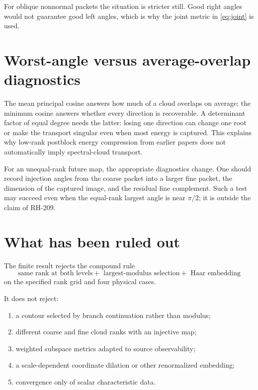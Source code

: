 \documentclass[12pt]{article}
\theoremstyle{remark}\newtheorem{remark}[theorem]{Remark}
\begin{document}
For oblique nonnormal packets the situation is stricter still.  Good right
angles would not guarantee good left angles, which is why the joint metric
in \eqref{eq:joint} is used.

\section{Worst-angle versus average-overlap diagnostics}

The mean principal cosine answers how much of a cloud overlaps on average;
the minimum cosine answers whether every direction is recoverable.  A
determinant factor of equal degree needs the latter: losing one direction can
change one root or make the transport singular even when most energy is
captured.  This explains why low-rank postblock energy compression from
earlier papers does not automatically imply spectral-cloud transport.

For an unequal-rank future map, the appropriate diagnostics change.  One
should record injection angles from the coarse packet into a larger fine
packet, the dimension of the captured image, and the residual fine
complement.  Such a test may succeed even when the equal-rank largest angle
is near $\pi/2$; it is outside the claim of RH-209.

\section{What has been ruled out}

The finite result rejects the compound rule
\begin{equation}\label{eq:rejected}
 \text{same rank at both levels}
 +\text{ largest-modulus selection}
 +\text{ Haar embedding}
\end{equation}
on the specified rank grid and four physical cases.

It does not reject:
\begin{enumerate}[leftmargin=2em]
\item a contour selected by branch continuation rather than modulus;
\item different coarse and fine cloud ranks with an injective map;
\item weighted subspace metrics adapted to source observability;
\item a scale-dependent coordinate dilation or other renormalized embedding;
\item convergence only of scalar characteristic data.
\end{enumerate}
\end{document}
